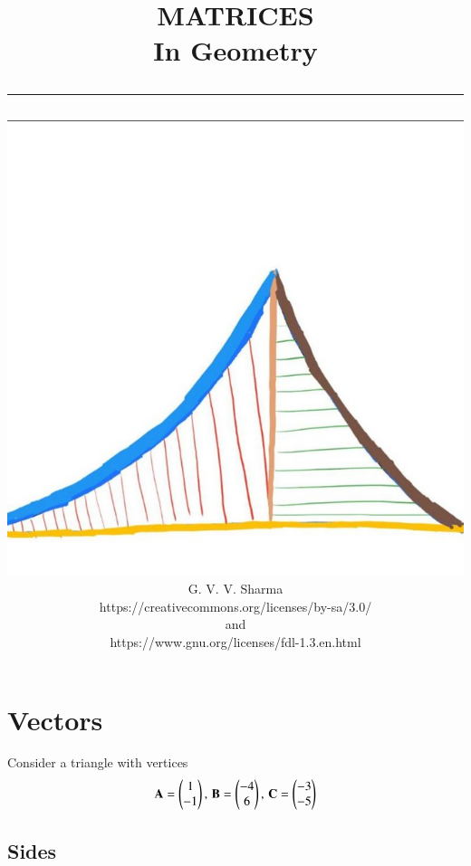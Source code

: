 \documentclass[journal]{IEEEtran}
\begin{document}

\onecolumn


\title{
	\begin{flushleft}
	MATRICES \\ In Geometry
	\\
\rule{0.4\columnwidth}{0.4pt}
\end{flushleft}
}
\author{
\vspace{7cm}
	\begin{flushleft}
\includegraphics[width=0.2\columnwidth]{figs/logo.jpg}
\\
		{	\huge G. V. V. Sharma}
		\\
\vspace{1cm}
https://creativecommons.org/licenses/by-sa/3.0/
\\
and
\\
https://www.gnu.org/licenses/fdl-1.3.en.html
	\end{flushleft}
}
\maketitle

\newpage


\tableofcontents

\newpage
\twocolumn

\section{Vectors}
Consider a triangle with vertices
		\begin{align}
			\label{eq:tri-pts}
			\mathbf{A} = \begin{pmatrix}1 \\ -1\end{pmatrix},\,
			\mathbf{B} = \begin{pmatrix}-4 \\ 6\end{pmatrix},\,
			\mathbf{C} = \begin{pmatrix}-3 \\ -5\end{pmatrix}
		\end{align}
\subsection{Sides}

\end{document}
